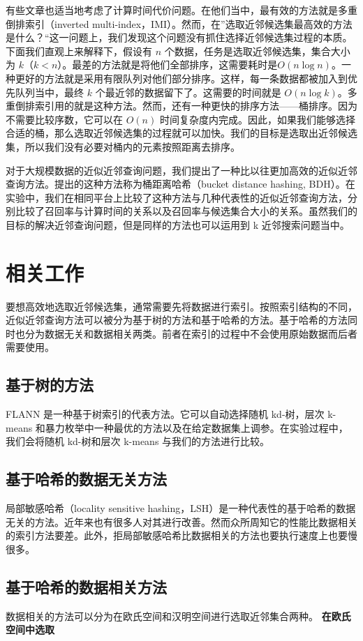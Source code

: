 有些文章也适当地考虑了计算时间代价问题。在他们当中，最有效的方法就是多重倒排索引（inverted multi-index，IMI）。然而，在”选取近邻候选集最高效的方法是什么？“这一问题上，我们发现这个问题没有抓住选择近邻候选集过程的本质。下面我们直观上来解释下，假设有 $n$ 个数据，任务是选取近邻候选集，集合大小为 $k$（$k<n$）。最差的方法就是将他们全部排序，这需要耗时是$O(n\log n)$。一种更好的方法就是采用有限队列对他们部分排序。这样，每一条数据都被加入到优先队列当中，最终 $k$ 个最近邻的数据留下了。这需要的时间就是 $O(n\log k)$。多重倒排索引用的就是这种方法。然而，还有一种更快的排序方法——桶排序。因为不需要比较序数，它可以在 $O(n)$ 时间复杂度内完成。因此，如果我们能够选择合适的桶，那么选取近邻候选集的过程就可以加快。我们的目标是选取出近邻候选集，所以我们没有必要对桶内的元素按照距离去排序。

对于大规模数据的近似近邻查询问题，我们提出了一种比以往更加高效的近似近邻查询方法。提出的这种方法称为桶距离哈希（bucket distance hashing, BDH）。在实验中，我们在相同平台上比较了这种方法与几种代表性的近似近邻查询方法，分别比较了召回率与计算时间的关系以及召回率与候选集合大小的关系。虽然我们的目标的解决近邻查询问题，但是同样的方法也可以运用到 k 近邻搜索问题当中。
\section{相关工作}
要想高效地选取近邻候选集，通常需要先将数据进行索引。按照索引结构的不同，近似近邻查询方法可以被分为基于树的方法和基于哈希的方法。基于哈希的方法同时也分为数据无关和数据相关两类。前者在索引的过程中不会使用原始数据而后者需要使用。
\subsection{基于树的方法}
FLANN 是一种基于树索引的代表方法。它可以自动选择随机 kd-树，层次 k-means 和暴力枚举中一种最优的方法以及在给定数据集上调参。在实验过程中，我们会将随机 kd-树和层次 k-means 与我们的方法进行比较。
\subsection{基于哈希的数据无关方法}
局部敏感哈希（locality sensitive hashing，LSH）是一种代表性的基于哈希的数据无关的方法。近年来也有很多人对其进行改善。然而众所周知它的性能比数据相关的索引方法要差。此外，拒局部敏感哈希比数据相关的方法也要执行速度上也要慢很多。
\subsection{基于哈希的数据相关方法}
数据相关的方法可以分为在欧氏空间和汉明空间进行选取近邻集合两种。
\textbf{在欧氏空间中选取} \\

